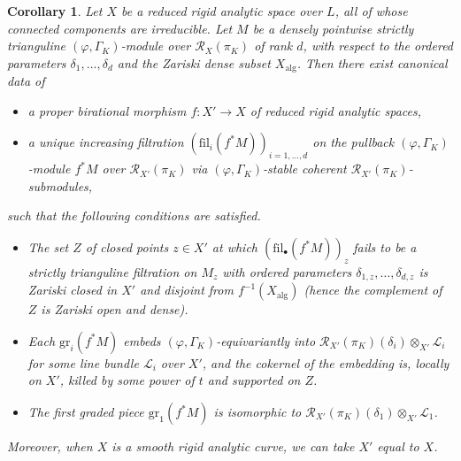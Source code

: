 \documentclass[12pt]{article}
\newtheorem{cor}[theorem]{Corollary}
\theoremstyle{definition}
\numberwithin{equation}{theorem}
\newcommand{\calL}{\mathcal{L}}
\newcommand{\calR}{\mathcal{R}}
\newcommand{\alg}{\mathrm{alg}}
\newcommand{\fil}{\mathrm{fil}}
\newcommand{\gr}{\mathrm{gr}}
\begin{document}
\begin{cor}
\label{C:global triangulation}
Let $X$ be a reduced rigid analytic space over $L$, all of whose connected components are irreducible.
Let $M$ be a densely pointwise strictly trianguline $(\varphi,\Gamma_K)$-module over $\calR_X(\pi_K)$ of rank $d$, with respect to the ordered parameters $\delta_1, \dots, \delta_d$ and the Zariski dense subset $X_\alg$.  Then there exist canonical data of
\begin{itemize}
\item[(a)] a proper birational morphism $f: X' \to X$ of reduced rigid analytic spaces,
\item[(b)] a unique increasing filtration $(\fil_i(f^*M))_{i=1, \dots, d}$ on the pullback $(\varphi, \Gamma_K)$-module $f^*M$ over $\calR_{X'}(\pi_K)$ via $(\varphi,\Gamma_K)$-stable coherent $\calR_{X'}(\pi_K)$-submodules,
\end{itemize}
such that the following conditions are satisfied.
\begin{itemize}
\item[(1)] The set $Z$ of closed points $z \in X'$ at which $(\fil_\bullet(f^*M))_z$ fails to be a strictly trianguline filtration on $M_z$ with ordered parameters $\delta_{1, z}, \dots, \delta_{d,z}$ is Zariski closed in $X'$ and disjoint from $f^{-1}(X_\alg)$ (hence the complement of $Z$ is Zariski open and dense).
\item[(2)] Each $\gr_i(f^*M)$ embeds $(\varphi, \Gamma_K)$-equivariantly into $\calR_{X'}(\pi_K)(\delta_i) \otimes_{X'} \calL_i$ for some line bundle $\calL_i$ over $X'$, and the cokernel of the embedding is, locally on $X'$, killed by some power of $t$ and supported on $Z$.
\item[(2')] The first graded piece $\gr_1(f^*M)$ is isomorphic to $\calR_{X'}(\pi_K)(\delta_1) \otimes_{X'} \calL_1$.
\end{itemize} 

Moreover, when $X$ is a smooth rigid analytic curve, we can take $X'$ equal to $X$.
\end{cor}
\end{document}
